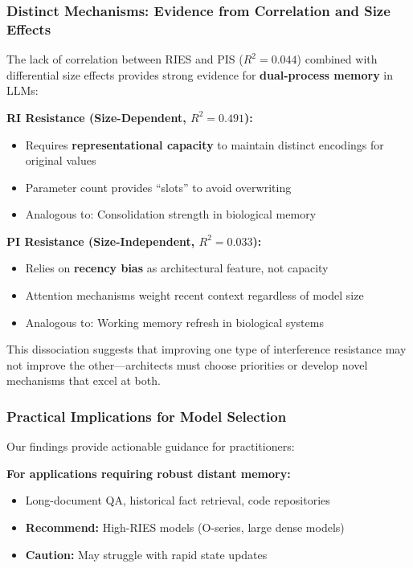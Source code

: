\documentclass{article}
\begin{document}
\subsubsection{Distinct Mechanisms: Evidence from Correlation and Size Effects}

The lack of correlation between RIES and PIS ($R^2 = 0.044$) combined with differential size effects provides strong evidence for \textbf{dual-process memory} in LLMs:

\textbf{RI Resistance (Size-Dependent, $R^2 = 0.491$):}
\begin{itemize}
    \item Requires \textbf{representational capacity} to maintain distinct encodings for original values
    \item Parameter count provides ``slots'' to avoid overwriting
    \item Analogous to: Consolidation strength in biological memory
\end{itemize}

\textbf{PI Resistance (Size-Independent, $R^2 = 0.033$):}
\begin{itemize}
    \item Relies on \textbf{recency bias} as architectural feature, not capacity
    \item Attention mechanisms weight recent context regardless of model size
    \item Analogous to: Working memory refresh in biological systems
\end{itemize}

This dissociation suggests that improving one type of interference resistance may not improve the other---architects must choose priorities or develop novel mechanisms that excel at both.

\subsubsection{Practical Implications for Model Selection}

Our findings provide actionable guidance for practitioners:

\textbf{For applications requiring robust distant memory:}
\begin{itemize}
    \item Long-document QA, historical fact retrieval, code repositories
    \item \textbf{Recommend:} High-RIES models (O-series, large dense models)
    \item \textbf{Caution:} May struggle with rapid state updates
\end{itemize}
\end{document}
